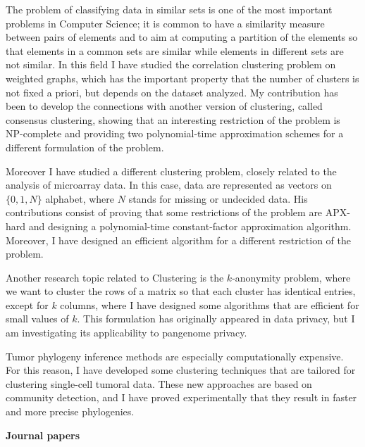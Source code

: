 \documentclass[11pt,a4paper,roman]{moderncv}
\begin{document}
The problem of classifying data in similar sets is one of the most
important problems in Computer Science; it is common to have a
similarity measure between pairs of elements and to aim at computing a
partition of the elements so that elements in a common sets are similar
while elements in different sets are not similar. In this field
I have studied the correlation clustering
problem on weighted graphs, which has the important property that the number of
clusters is not fixed a priori, but depends on the dataset analyzed.
My contribution has been to develop the connections with another version of
clustering, called consensus clustering, showing that an
interesting restriction of the problem is NP-complete and providing two
polynomial-time approximation schemes for a different formulation of the
problem.

Moreover I have studied a different clustering problem, closely related
to the analysis of microarray data. In this case, data are represented
as vectors on \(\{0,1,N\}\) alphabet, where \(N\) stands for missing or
undecided data. His contributions consist of proving that some
restrictions of the problem are APX-hard and designing a polynomial-time
constant-factor approximation algorithm. Moreover, I have designed an
efficient algorithm for a different restriction of the problem.

Another research topic related to Clustering is the \(k\)-anonymity problem,
where we want to cluster the rows of a matrix so that each cluster has identical
entries, except for \(k\) columns, where I have designed some algorithms that
are efficient for small values of \(k\).
This formulation has originally appeared in data privacy, but I am investigating
its applicability to pangenome privacy.


Tumor phylogeny inference methods are especially computationally expensive.
For this reason, I have developed some clustering techniques that are tailored
for clustering single-cell tumoral data.
These new approaches are based on community detection, and I have proved
experimentally that they result in faster and more precise phylogenies.


\textbf{Journal papers}

\cite{chourasiaReads2VecEfficientEmbedding2023}
\cite{10.1093/gigascience/giac119}
\cite{DBLP:journals/titb/CiccolellaPBV21}
\cite{DBLP:journals/jco/BonizzoniVDP13}
\cite{DBLP:journals/tcs/BonizzoniVD12}
\cite{DBLP:journals/jco/BonizzoniVD11}
\cite{DBLP:journals/algorithmica/BonizzoniVDM10}
\cite{DBLP:journals/jcss/BonizzoniVDJ08}
\end{document}
